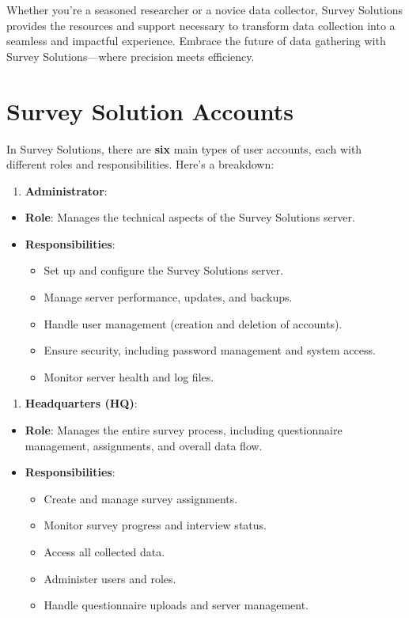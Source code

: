 \documentclass[
  letterpaper,
  DIV=11,
  numbers=noendperiod]{scrreprt}
\providecommand{\tightlist}{%
  \setlength{\itemsep}{0pt}\setlength{\parskip}{0pt}}\usepackage{longtable,booktabs,array}
\begin{document}
Whether you're a seasoned researcher or a novice data collector, Survey
Solutions provides the resources and support necessary to transform data
collection into a seamless and impactful experience. Embrace the future
of data gathering with Survey Solutions---where precision meets
efficiency.

\section{Survey Solution Accounts}\label{survey-solution-accounts}

In Survey Solutions, there are \textbf{six} main types of user accounts,
each with different roles and responsibilities. Here's a breakdown:

\begin{enumerate}
\def\labelenumi{\arabic{enumi}.}
\tightlist
\item
  \textbf{Administrator}:
\end{enumerate}

\begin{itemize}
\item
  \textbf{Role}: Manages the technical aspects of the Survey Solutions
  server.
\item
  \textbf{Responsibilities}:

  \begin{itemize}
  \item
    Set up and configure the Survey Solutions server.
  \item
    Manage server performance, updates, and backups.
  \item
    Handle user management (creation and deletion of accounts).
  \item
    Ensure security, including password management and system access.
  \item
    Monitor server health and log files.
  \end{itemize}
\end{itemize}

\begin{enumerate}
\def\labelenumi{\arabic{enumi}.}
\setcounter{enumi}{1}
\tightlist
\item
  \textbf{Headquarters (HQ)}:
\end{enumerate}

\begin{itemize}
\item
  \textbf{Role}: Manages the entire survey process, including
  questionnaire management, assignments, and overall data flow.
\item
  \textbf{Responsibilities}:

  \begin{itemize}
  \item
    Create and manage survey assignments.
  \item
    Monitor survey progress and interview status.
  \item
    Access all collected data.
  \item
    Administer users and roles.
  \item
    Handle questionnaire uploads and server management.
  \end{itemize}
\end{itemize}
\end{document}
